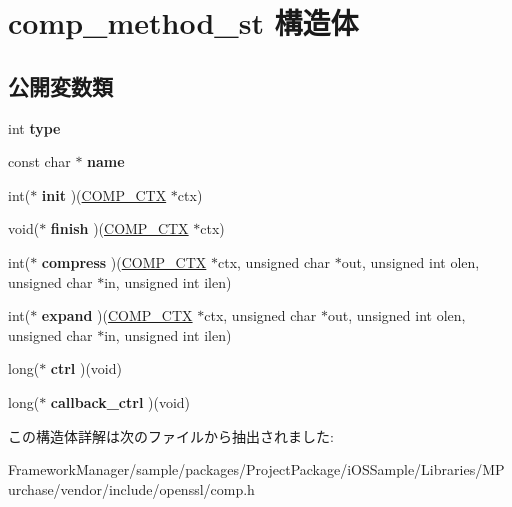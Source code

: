 \hypertarget{structcomp__method__st}{}\section{comp\+\_\+method\+\_\+st 構造体}
\label{structcomp__method__st}
\subsection*{公開変数類}
\begin{DoxyCompactItemize}
\item 
\hypertarget{structcomp__method__st_a398382b23088b56dc05184016dfe247c}{}int {\bfseries type}\label{structcomp__method__st_a398382b23088b56dc05184016dfe247c}

\item 
\hypertarget{structcomp__method__st_a2331b9bae2f1539bab8e75efc58283b1}{}const char $\ast$ {\bfseries name}\label{structcomp__method__st_a2331b9bae2f1539bab8e75efc58283b1}

\item 
\hypertarget{structcomp__method__st_af175cb97f5906c4298b88c65507a8a64}{}int($\ast$ {\bfseries init} )(\hyperlink{structcomp__ctx__st}{C\+O\+M\+P\+\_\+\+C\+T\+X} $\ast$ctx)\label{structcomp__method__st_af175cb97f5906c4298b88c65507a8a64}

\item 
\hypertarget{structcomp__method__st_af6a0a033a48d84fad2cfd6776f4c2dfc}{}void($\ast$ {\bfseries finish} )(\hyperlink{structcomp__ctx__st}{C\+O\+M\+P\+\_\+\+C\+T\+X} $\ast$ctx)\label{structcomp__method__st_af6a0a033a48d84fad2cfd6776f4c2dfc}

\item 
\hypertarget{structcomp__method__st_ad894ddf63c5ec8904fc9ea47d138fbac}{}int($\ast$ {\bfseries compress} )(\hyperlink{structcomp__ctx__st}{C\+O\+M\+P\+\_\+\+C\+T\+X} $\ast$ctx, unsigned char $\ast$out, unsigned int olen, unsigned char $\ast$in, unsigned int ilen)\label{structcomp__method__st_ad894ddf63c5ec8904fc9ea47d138fbac}

\item 
\hypertarget{structcomp__method__st_a553b3c0860205e265266e958eba563af}{}int($\ast$ {\bfseries expand} )(\hyperlink{structcomp__ctx__st}{C\+O\+M\+P\+\_\+\+C\+T\+X} $\ast$ctx, unsigned char $\ast$out, unsigned int olen, unsigned char $\ast$in, unsigned int ilen)\label{structcomp__method__st_a553b3c0860205e265266e958eba563af}

\item 
\hypertarget{structcomp__method__st_a1759ea60f1c12ec6d9489855b78b1463}{}long($\ast$ {\bfseries ctrl} )(void)\label{structcomp__method__st_a1759ea60f1c12ec6d9489855b78b1463}

\item 
\hypertarget{structcomp__method__st_a56f1252386d5b98a5560b1ada313ce09}{}long($\ast$ {\bfseries callback\+\_\+ctrl} )(void)\label{structcomp__method__st_a56f1252386d5b98a5560b1ada313ce09}

\end{DoxyCompactItemize}


この構造体詳解は次のファイルから抽出されました\+:\begin{DoxyCompactItemize}
\item 
Framework\+Manager/sample/packages/\+Project\+Package/i\+O\+S\+Sample/\+Libraries/\+M\+Purchase/vendor/include/openssl/comp.\+h\end{DoxyCompactItemize}
